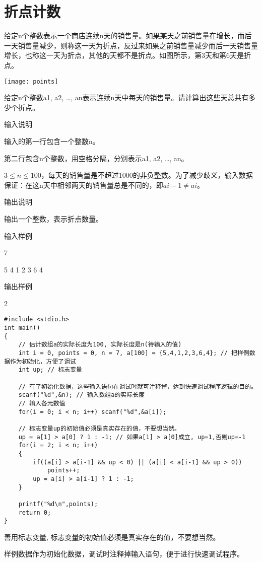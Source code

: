 \section{折点计数}	
给定n个整数表示一个商店连续n天的销售量。如果某天之前销售量在增长，而后一天销售量减少，则称这一天为折点，反过来如果之前销售量减少而后一天销售量增长，也称这一天为折点，其他的天都不是折点。如图所示，第3天和第6天是折点。

\texttt{[image: points]}

给定n个整数a1, a2, \dots, an表示连续n天中每天的销售量。请计算出这些天总共有多少个折点。

输入说明
	
输入的第一行包含一个整数n。

第二行包含n个整数，用空格分隔，分别表示a1, a2, \dots, an。

$3\le n\le 100$，每天的销售量是不超过1000的非负整数。为了减少歧义，输入数据保证：在这n天中相邻两天的销售量总是不同的，即$ai-1\ne ai$。

输出说明	

输出一个整数，表示折点数量。

输入样例	

7

5 4 1 2 3 6 4

输出样例
	
2

\begin{lstlisting}
#include <stdio.h>
int main()
{
    // 估计数组a的实际长度为100, 实际长度是n(待输入的值)
	int i = 0, points = 0, n = 7, a[100] = {5,4,1,2,3,6,4}; // 把样例数据作为初始化，方便了调试
	int up; // 标志变量 
	
	// 有了初始化数据，这些输入语句在调试时就可注释掉，达到快速调试程序逻辑的目的。
	scanf("%d",&n); // 输入数组a的实际长度
	// 输入各元数值
	for(i = 0; i < n; i++) scanf("%d",&a[i]);
	
	// 标志变量up的初始值必须是真实存在的值，不要想当然。
	up = a[1] > a[0] ? 1 : -1; // 如果a[1] > a[0]成立, up=1,否则up=-1
	for(i = 2; i < n; i++)
	{
		if((a[i] > a[i-1] && up < 0) || (a[i] < a[i-1] && up > 0))
			points++;
		up = a[i] > a[i-1] ? 1 : -1;
	}
	
	printf("%d\n",points);
	return 0;
} 
\end{lstlisting}

\begin{note}[要点]
	善用标志变量, 标志变量的初始值必须是真实存在的值，不要想当然。
	
	样例数据作为初始化数据，调试时注释掉输入语句，便于进行快速调试程序。
\end{note}

